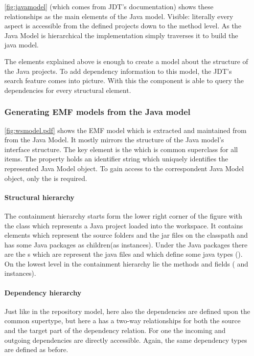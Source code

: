 \autoref{fig:javamodel} (which comes from JDT's documentation) shows these
relationships as the main elements of the Java model. Visible: literally every aspect 
is accessible from the defined projects down to the method level. As the Java Model 
is hierarchical the implementation simply traverses it to build the java model. 

The elements explained above is enough to create a model about the structure of
the Java projects. To add dependency information to this model, the JDT's search
feature comes into picture. With this the component is able to query the dependencies
for every structural element. 

\subsubsection{Generating EMF models from the Java model}
\autoref{fig:wsmodel.pdf} shows the EMF model which is extracted and maintained
from from the Java Model. It mostly mirrors the structure of the Java model's
interface structure. The key element is the  which is common
superclass for all items. The  property holds an identifier string
which uniquely identifies the represented Java Model object. To gain access to
the correspondent Java Model object, only the  is
required.

\paragraph{Structural hierarchy}
The containment hierarchy starts form the lower right corner of the figure with
the  class which represents a Java project loaded into the
workspace. It contains  elements which represent the
source folders and the jar files on the classpath and has some Java packages as
children(as  instances). Under the Java packages there
are the s which are represent the java files and which
define some java types (). On the lowest level in the containment
hierarchy lie the methods and fields ( and 
instances).

\paragraph{Dependency hierarchy}
Just like in the repository model, here also the dependencies are defined upon
the common supertype, but here a  has a two-way relationships
for both the source and the target part of the dependency relation. For one
 the incoming and outgoing dependencies are directly
accessible. Again, the same dependency types are defined as before.

